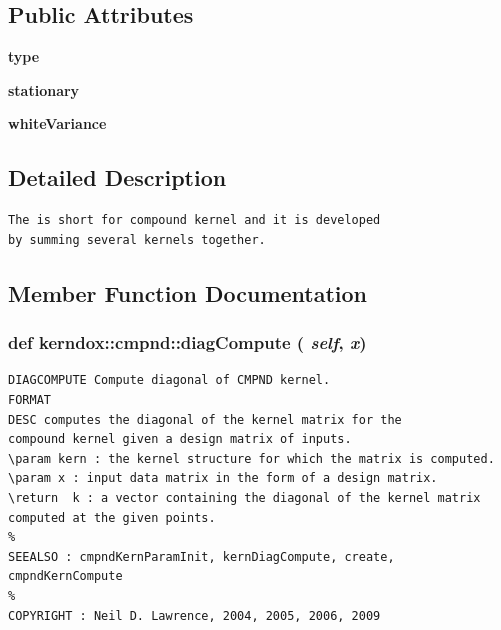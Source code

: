 \subsection*{Public Attributes}
\begin{CompactItemize}
\item 
\hypertarget{classkerndox_1_1cmpnd_f2b47be8a728ecdc7f72147d386bd38d}{
\textbf{type}}
\label{classkerndox_1_1cmpnd_f2b47be8a728ecdc7f72147d386bd38d}

\item 
\hypertarget{classkerndox_1_1cmpnd_728be225e33829677518a682bc8fbd31}{
\textbf{stationary}}
\label{classkerndox_1_1cmpnd_728be225e33829677518a682bc8fbd31}

\item 
\hypertarget{classkerndox_1_1cmpnd_d4bf8795eac773b70d19b9af0098d11a}{
\textbf{whiteVariance}}
\label{classkerndox_1_1cmpnd_d4bf8795eac773b70d19b9af0098d11a}

\end{CompactItemize}


\subsection{Detailed Description}


\footnotesize\begin{verbatim}The is short for compound kernel and it is developed
by summing several kernels together.\end{verbatim}
\normalsize
 

\subsection{Member Function Documentation}
\hypertarget{classkerndox_1_1cmpnd_7d72493b41b96c0609578f099c645502}{
\subsubsection[{diagCompute}]{\setlength{\rightskip}{0pt plus 5cm}def kerndox::cmpnd::diagCompute ( {\em self}, \/   {\em x})}}
\label{classkerndox_1_1cmpnd_7d72493b41b96c0609578f099c645502}




\footnotesize\begin{verbatim}DIAGCOMPUTE Compute diagonal of CMPND kernel.
FORMAT
DESC computes the diagonal of the kernel matrix for the
compound kernel given a design matrix of inputs.
\param kern : the kernel structure for which the matrix is computed.
\param x : input data matrix in the form of a design matrix.
\return  k : a vector containing the diagonal of the kernel matrix
computed at the given points.
%
SEEALSO : cmpndKernParamInit, kernDiagCompute, create, cmpndKernCompute
%
COPYRIGHT : Neil D. Lawrence, 2004, 2005, 2006, 2009

\end{verbatim}
\normalsize
 

